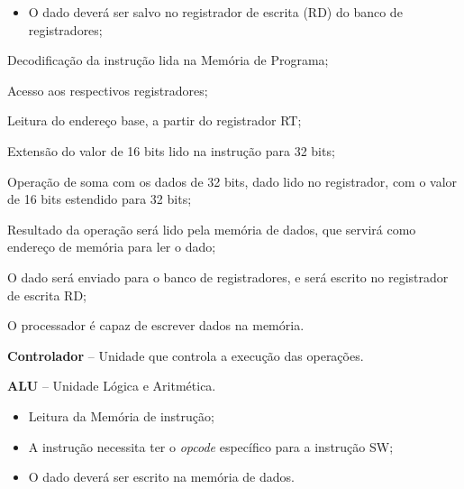 \documentclass{article}
\begin{document}
  \postconditions
    \begin{itemize}
     \item O dado deverá ser salvo no registrador de escrita (RD) do banco de registradores;
    \end{itemize}
  
  
  \begin{mainflow}
    \item Decodificação da instrução lida na Memória de Programa;
    \item Acesso aos respectivos registradores;
	\item Leitura do endereço base, a partir do registrador RT;
	\item Extensão do valor de 16 bits lido na instrução para 32 bits;
	\item Operação de soma com os dados de 32 bits, dado lido no registrador, com o valor de 16 bits estendido para 32 bits;
	\item Resultado da operação será lido pela memória de dados, que servirá como endereço de memória para ler o dado;
	\item O dado será enviado para o banco de registradores, e será escrito no registrador de escrita RD;

  \end{mainflow}
  
  O processador é capaz de escrever dados na memória.
  \actors
    \begin{description}
     \item \textbf{Controlador} – Unidade que controla a execução das operações.
     \item \textbf{ALU} – Unidade L\'{o}gica e Aritm\'{e}tica.
    \end{description}
    
  \preconditions 
    \begin{itemize}
     \item Leitura da Memória de instrução;
     \item A instrução necessita ter o \textit{opcode} específico para a instrução SW;
    \end{itemize}

  \postconditions
    \begin{itemize}
     \item O dado deverá ser escrito na memória de dados.
    \end{itemize}
  
\end{document}
